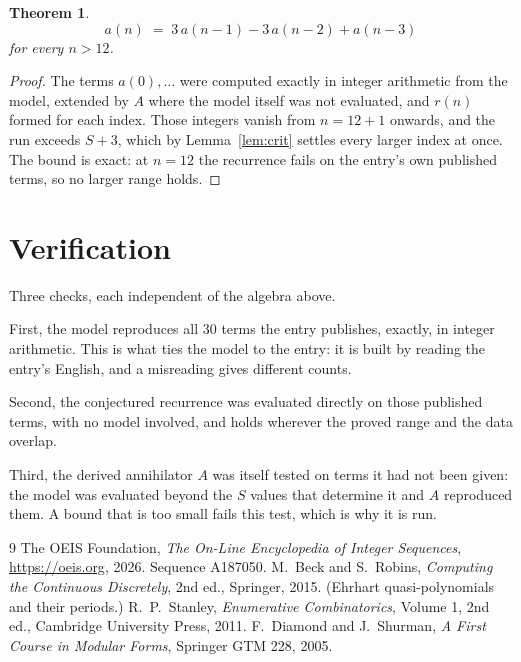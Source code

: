 \documentclass[11pt,a4paper]{article}
\theoremstyle{plain}
\newtheorem{theorem}{Theorem}
\theoremstyle{definition}
\begin{document}
\begin{theorem}
\[
a(n)\;=\;3\,a(n-1) - 3\,a(n-2) + a(n-3)
\]
for every $n>12$.
\end{theorem}

\begin{proof}
The terms $a(0),\dots$ were computed exactly in integer arithmetic from the model, extended by
$A$ where the model itself was not evaluated, and $r(n)$ formed for each index. Those integers
vanish from $n=12+1$ onwards, and the run exceeds $S+3$, which by
Lemma~\ref{lem:crit} settles every larger index at once. The bound is exact: at $n=12$ the recurrence fails on the entry's own published terms, so no larger range holds.
\end{proof}

\section{Verification}

Three checks, each independent of the algebra above.

First, the model reproduces all $30$ terms the entry publishes, exactly, in integer
arithmetic. This is what ties the model to the entry: it is built by reading the entry's
English, and a misreading gives different counts.

Second, the conjectured recurrence was evaluated directly on those published terms, with no
model involved, and holds wherever the proved range and the data overlap.

Third, the derived annihilator $A$ was itself tested on terms it had not been given: the model
was evaluated beyond the $S$ values that determine it and $A$ reproduced them. A bound that is
too small fails this test, which is why it is run.

\begin{thebibliography}{9}
 The OEIS Foundation, \emph{The On-Line Encyclopedia of Integer
Sequences}, \url{https://oeis.org}, 2026. Sequence A187050.
 M.~Beck and S.~Robins, \emph{Computing the Continuous Discretely},
2nd ed., Springer, 2015. (Ehrhart quasi-polynomials and their periods.)
 R.~P.~Stanley, \emph{Enumerative Combinatorics}, Volume 1, 2nd ed.,
Cambridge University Press, 2011.
 F.~Diamond and J.~Shurman, \emph{A First Course in Modular Forms},
Springer GTM 228, 2005.
\end{thebibliography}
\end{document}
